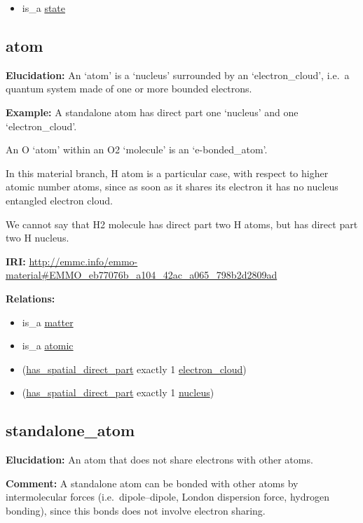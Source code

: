 \documentclass[a4paper,]{report}
\providecommand{\tightlist}{%
  \setlength{\itemsep}{0pt}\setlength{\parskip}{0pt}}
\begin{document}
\begin{itemize}
\tightlist
\item
  is\_a \protect\hyperlink{state}{state}
\end{itemize}

\hypertarget{atom}{%
\subsection{atom}\label{atom}}

\textbf{Elucidation:} An `atom' is a `nucleus' surrounded by an
`electron\_cloud', i.e.~a quantum system made of one or more bounded
electrons.

\textbf{Example:} A standalone atom has direct part one `nucleus' and
one `electron\_cloud'.

An O `atom' within an O2 `molecule' is an `e-bonded\_atom'.

In this material branch, H atom is a particular case, with respect to
higher atomic number atoms, since as soon as it shares its electron it
has no nucleus entangled electron cloud.

We cannot say that H2 molecule has direct part two H atoms, but has
direct part two H nucleus.

\textbf{IRI:}
\url{http://emmc.info/emmo-material\#EMMO_eb77076b_a104_42ac_a065_798b2d2809ad}

\textbf{Relations:}

\begin{itemize}
\tightlist
\item
  is\_a \protect\hyperlink{matter}{matter}
\item
  is\_a \protect\hyperlink{atomic}{atomic}
\item
  (\protect\hyperlink{has_spatial_direct_part}{has\_spatial\_direct\_part}
  exactly 1 \protect\hyperlink{electron_cloud}{electron\_cloud})
\item
  (\protect\hyperlink{has_spatial_direct_part}{has\_spatial\_direct\_part}
  exactly 1 \protect\hyperlink{nucleus}{nucleus})
\end{itemize}

\hypertarget{standalone_atom}{%
\subsection{standalone\_atom}\label{standalone_atom}}

\textbf{Elucidation:} An atom that does not share electrons with other
atoms.

\textbf{Comment:} A standalone atom can be bonded with other atoms by
intermolecular forces (i.e.~dipole--dipole, London dispersion force,
hydrogen bonding), since this bonds does not involve electron sharing.
\end{document}
